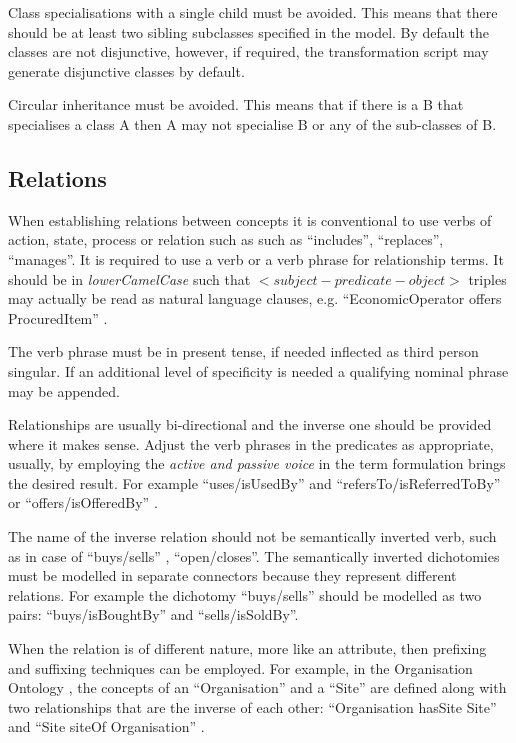 	Class specialisations with a single child must be avoided. This means that there should be at least two sibling subclasses specified in the model. By default the classes are not disjunctive, however, if required, the transformation script may generate disjunctive classes by default.
	
	Circular inheritance must be avoided. This means that if there is a B that specialises a class A then A may not specialise B or any of the sub-classes of B. 
	
	\subsection{Relations}
	\label{sec:relations}
	
	When establishing relations between concepts it is conventional to use verbs of action, state, process or relation such as such as ``includes'', ``replaces'', ``manages''. It is required to use a verb or a verb phrase for relationship terms. It should be in \textit{lowerCamelCase} such that $<subject-predicate-object>$ triples may actually be read as natural language clauses, e.g. ``EconomicOperator offers ProcuredItem'' \cite{d2.01-2017}.
	
	The verb phrase must be in present tense, if needed inflected as third person singular. If an additional level of specificity is needed a qualifying nominal phrase may be appended. 
	
	Relationships are usually bi-directional and the inverse one should be provided where it makes sense. Adjust the verb phrases in the predicates as appropriate, usually, by employing the \textit{active and passive voice} in the term formulation brings the desired result. For example ``uses/isUsedBy'' and ``refersTo/isReferredToBy'' or ``offers/isOfferedBy'' \cite{d2.01-2017}.
	
	The name of the inverse relation should not be semantically inverted verb, such as in case of ``buys/sells'' , ``open/closes''. The semantically inverted dichotomies must be modelled in separate connectors because they represent different relations. For example the dichotomy ``buys/sells'' should be modelled as two pairs: ``buys/isBoughtBy'' and ``sells/isSoldBy''.
	
	When the relation is of different nature, more like an attribute, then prefixing and suffixing techniques can be employed. For example, in the Organisation Ontology \cite{org-ontology}, the concepts of an ``Organisation'' and a ``Site'' are defined along with two relationships that are the inverse of each other: ``Organisation hasSite Site'' and ``Site siteOf Organisation'' \citep{d3.1-2015}.
	
